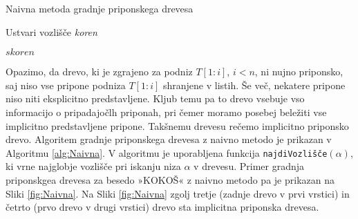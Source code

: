 \begin{algorithm}[htb]

    \caption{Naivna metoda gradnje priponskega drevesa}\label{alg:Naivna}
    {
        {Ustvari vozlišče \textit{koren}}
        
        {$s \textit{koren}$}
        
        
    }
\end{algorithm}

Opazimo, da drevo, ki je zgrajeno za podniz $T[1:i]$, $i< n$, ni nujno priponsko, saj niso vse pripone podniza $T[1:i]$ shranjene v listih. Še več, nekatere pripone niso niti eksplicitno predstavljene. Kljub temu pa to drevo vsebuje vso informacijo o pripadajočlh priponah, pri čemer moramo posebej beležiti vse implicitno predstavljene pripone. Takšnemu drevesu rečemo implicitno priponsko drevo. Algoritem gradnje priponskega drevesa z naivno metodo je prikazan v Algoritmu \ref{alg:Naivna}. V algoritmu je uporabljena funkcija \texttt{najdiVozlišče}$(\alpha)$, ki vrne najglobje vozlišče pri iskanju niza $\alpha$ v drevesu. Primer gradnja priponskgea drevesa za besedo »KOKOŠ« z naivno metodo pa je prikazan na Sliki \ref{fig:Naivna}. Na Sliki \ref{fig:Naivna} zgolj tretje (zadnje drevo v prvi vrstici) in četrto (prvo drevo v drugi vrstici) drevo sta implicitna priponska drevesa.

